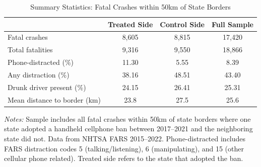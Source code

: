 \begin{table}[htbp]
\centering
\caption{Summary Statistics: Fatal Crashes within 50km of State Borders}
\label{tab:sumstats}
\begin{tabular}{lccc}
\hline\hline
 & Treated Side & Control Side & Full Sample \\
\hline
Fatal crashes & 8,605 & 8,815 & 17,420 \\
Total fatalities & 9,316 & 9,550 & 18,866 \\
Phone-distracted (\%) & 11.30 & 5.55 & 8.39 \\
Any distraction (\%) & 38.16 & 48.51 & 43.40 \\
Drunk driver present (\%) & 24.15 & 26.41 & 25.31 \\
Mean distance to border (km) & 23.8 & 27.5 & 25.6 \\
\hline\hline
\end{tabular}
\begin{tablenotes}
\item \textit{Notes:} Sample includes all fatal crashes within 50km of state borders where one state adopted a handheld cellphone ban between 2017--2021 and the neighboring state did not. Data from NHTSA FARS 2015--2022. Phone-distracted includes FARS distraction codes 5 (talking/listening), 6 (manipulating), and 15 (other cellular phone related). Treated side refers to the state that adopted the ban.
\end{tablenotes}
\end{table}

